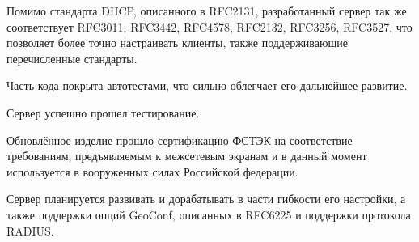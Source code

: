 \documentclass[12pt]{article}
\begin{document}
Помимо стандарта DHCP, описанного в RFC2131, разработанный сервер так же соответствует RFC3011, RFC3442, RFC4578, RFC2132, RFC3256, RFC3527, что позволяет более точно настраивать клиенты, также поддерживающие перечисленные стандарты.

Часть кода покрыта автотестами, что сильно облегчает его дальнейшее развитие.

Сервер успешно прошел тестирование.

Обновлённое изделие прошло сертификацию ФСТЭК на соответствие требованиям, предъявляемым к межсетевым экранам и в данный момент используется в вооруженных силах Российской федерации.

Сервер планируется развивать и дорабатывать в части гибкости его настройки, а также поддержки опций GeoConf, описанных в RFC6225 и поддержки протокола RADIUS.
\end{document}
